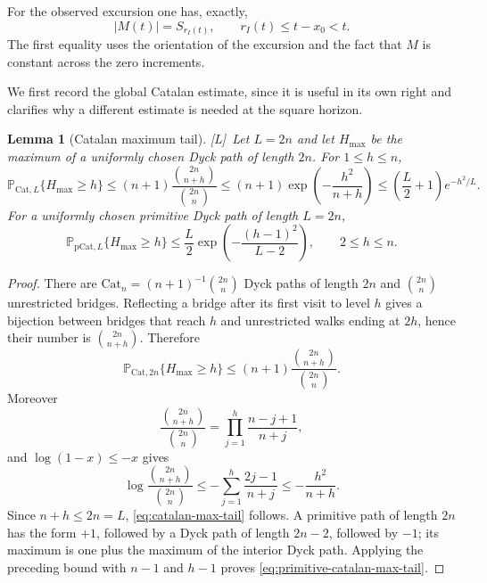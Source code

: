 \documentclass[11pt]{amsart}
\numberwithin{equation}{section}
\theoremstyle{plain}
\newtheorem{lemma}[theorem]{Lemma}
\theoremstyle{definition}
\theoremstyle{remark}
\newcommand{\tagL}{\textup{[L]}}
\begin{document}
For the observed excursion one has, exactly,
\begin{equation}
\label{eq:support-time-height}
 |M(t)|=S_{r_I(t)},
 \qquad
 r_I(t)\le t-x_0<t.
\end{equation}
The first equality uses the orientation of the excursion and the fact that
$M$ is constant across the zero increments.

We first record the global Catalan estimate, since it is useful in its own
right and clarifies why a different estimate is needed at the square
horizon.

\begin{lemma}[Catalan maximum tail]
\label{lem:catalan-max-tail}
\tagL\ Let $L=2n$ and let $H_{\max}$ be the maximum of a uniformly chosen Dyck path
of length $2n$.  For $1\le h\le n$,
\begin{equation}
\label{eq:catalan-max-tail}
 \mathbb P_{\mathrm{Cat},L}\{H_{\max}\ge h\}
 \le (n+1)\frac{\binom{2n}{n+h}}{\binom{2n}{n}}
 \le (n+1)\exp\!\left(-\frac{h^2}{n+h}\right)
 \le \left(\frac L2+1\right)e^{-h^2/L}.
\end{equation}
For a uniformly chosen primitive Dyck path of length $L=2n$,
\begin{equation}
\label{eq:primitive-catalan-max-tail}
 \mathbb P_{\mathrm{pCat},L}\{H_{\max}\ge h\}
 \le \frac L2\exp\!\left(-\frac{(h-1)^2}{L-2}\right),
 \qquad 2\le h\le n.
\end{equation}
\end{lemma}

\begin{proof}
There are $\mathrm{Cat}_n=(n+1)^{-1}\binom{2n}{n}$ Dyck paths of length $2n$ and
$\binom{2n}{n}$ unrestricted bridges.  Reflecting a bridge after its first
visit to level $h$ gives a bijection between bridges that reach $h$ and
unrestricted walks ending at $2h$, hence their number is
$\binom{2n}{n+h}$.  Therefore
\[
 \mathbb P_{\mathrm{Cat},2n}\{H_{\max}\ge h\}
 \le (n+1)\frac{\binom{2n}{n+h}}{\binom{2n}{n}}.
\]
Moreover
\[
 \frac{\binom{2n}{n+h}}{\binom{2n}{n}}
 =\prod_{j=1}^h\frac{n-j+1}{n+j},
\]
and $\log(1-x)\le-x$ gives
\[
 \log\frac{\binom{2n}{n+h}}{\binom{2n}{n}}
 \le-\sum_{j=1}^h\frac{2j-1}{n+j}
 \le-\frac{h^2}{n+h}.
\]
Since $n+h\le2n=L$, \eqref{eq:catalan-max-tail} follows.  A primitive path
of length $2n$ has the form $+1$, followed by a Dyck path of length $2n-2$,
followed by $-1$; its maximum is one plus the maximum of the interior Dyck
path.  Applying the preceding bound with $n-1$ and $h-1$ proves
\eqref{eq:primitive-catalan-max-tail}.
\end{proof}
\end{document}
